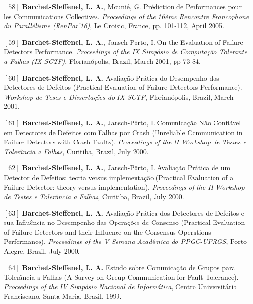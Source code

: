 \documentclass[final,twoside]{hdr} %
\begin{document}
\vspace{1em} \noindent $[58]$
\textbf{Barchet-Steffenel, L. A.}, Mounié, G. {Prédiction de Performances pour les Communications Collectives}. {\em Proceedings of the 16ème Rencontre Francophone du Parallélisme (RenPar'16)}, Le Croisic, France, pp. 101-112, April 2005. 

\vspace{1em} \noindent $[59]$
\textbf{Barchet-Steffenel, L. A.}, Jansch-Pôrto, I. {On the Evaluation of Failure Detectors Performance}. {\em Proceedings of the IX Simpósio de Computação Tolerante a Falhas (IX SCTF)}, Florianópolis, Brazil, March 2001, pp 73-84.

\vspace{1em} \noindent $[60]$
\textbf{Barchet-Steffenel, L. A.} {Avaliação Prática do Desempenho dos Detectores de Defeitos} (Practical Evaluation of Failure Detectors Performance). {\em Workshop de Teses e Dissertações do IX SCTF}, Florianópolis, Brazil, March 2001. 

\vspace{1em} \noindent $[61]$
\textbf{Barchet-Steffenel, L. A.}, Jansch-Pôrto, I. {Comunicação Não Confiável em Detectores de Defeitos com Falhas por Crash} (Unreliable Communication in Failure Detectors with Crash Faults). {\em Proceedings of the II Workshop de Testes e Tolerância a Falhas}, Curitiba, Brazil, July 2000. 

\vspace{1em} \noindent $[62]$
\textbf{Barchet-Steffenel, L. A.}, Jansch-Pôrto, I. {Avaliação Prática de um Detector de Defeitos: teoria versus implementação} (Practical Evaluation of a Failure Detector: theory versus implementation). {\em Proceedings of the II Workshop de Testes e Tolerância a Falhas}, Curitiba, Brazil, July 2000. 

\vspace{1em} \noindent $[63]$
\textbf{Barchet-Steffenel, L. A.} {Avaliação Prática dos Detectores de Defeitos e sua Influência no Desempenho das Operações de Consenso} (Practical Evaluation of Failure Detectors and their Influence on the Consensus Operations Performance). {\em Proceedings of the V Semana Acadêmica do PPGC-UFRGS}, Porto Alegre, Brazil, July 2000. 

\vspace{1em} \noindent $[64]$
\textbf{Barchet-Steffenel, L. A.} {Estudo sobre Comunicação de Grupos para Tolerância a Falhas} (A Survey on Group Communication for Fault Tolerance). {\em Proceedings of the IV Simpósio Nacional de Informática}, Centro Universitário Franciscano, Santa Maria, Brazil, 1999. 
\end{document}
